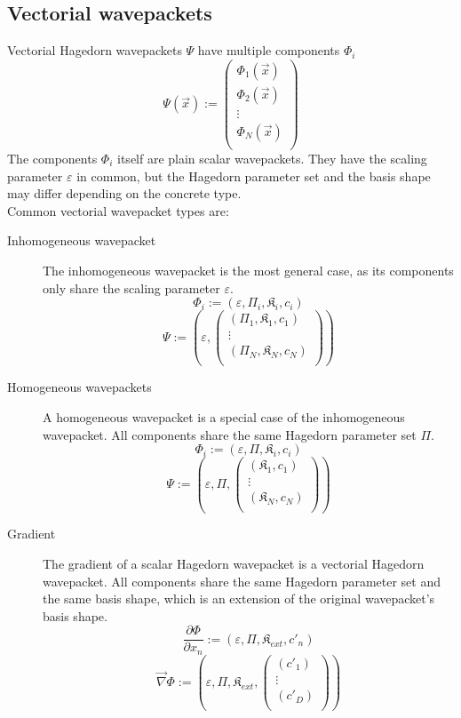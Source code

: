 \documentclass{article}
\begin{document}
\subsection{Vectorial wavepackets}
Vectorial Hagedorn wavepackets \(\Psi\) have multiple components \(\Phi_i\)
\[
  \Psi(\vec{x}) :=
  \begin{pmatrix}
    \Phi_1(\vec{x}) \\
    \Phi_2(\vec{x}) \\
    \vdots \\
    \Phi_N(\vec{x}) \\
  \end{pmatrix}
\]
The components \(\Phi_i\) itself are plain scalar wavepackets.
They have the scaling parameter \(\varepsilon\) in common, but
the Hagedorn parameter set and the basis shape may differ depending on
the concrete type. \\
Common vectorial wavepacket types are:
\begin{description}
\item[Inhomogeneous wavepacket]
  The inhomogeneous wavepacket is the most general case, as its components only share
  the scaling parameter \(\varepsilon\).
  \[
    \Phi_i := (\varepsilon, \Pi_i, \mathfrak{K}_i, c_i) \] \[
    \Psi := \left(\varepsilon, 
    \begin{pmatrix}
      (\Pi_1, \mathfrak{K}_1, c_1) \\
      \vdots \\
      (\Pi_N, \mathfrak{K}_N, c_N) \\
    \end{pmatrix}\right)
  \]
\item[Homogeneous wavepackets]
  A homogeneous wavepacket is a special case of the inhomogeneous wavepacket.
  All components share the same Hagedorn parameter set \(\Pi\).
  \[
    \Phi_i := (\varepsilon, \Pi, \mathfrak{K}_i, c_i) \] \[
    \Psi := \left(\varepsilon, \Pi,
    \begin{pmatrix}
      (\mathfrak{K}_1, c_1) \\
      \vdots \\
      (\mathfrak{K}_N, c_N) \\
    \end{pmatrix}\right)
  \]
\item[Gradient]
  The gradient of a scalar Hagedorn wavepacket is a vectorial Hagedorn
  wavepacket. All components share the same Hagedorn parameter set and the
  same basis shape, which is an extension of the original wavepacket's basis shape.
  \[
    \frac{\partial \Phi}{\partial x_n} := (\varepsilon, \Pi, \mathfrak{K}_{ext}, c'_n) \] \[
    \vec{\nabla} \Phi := \left(\varepsilon, \Pi, \mathfrak{K}_{ext},
    \begin{pmatrix}
      (c'_1) \\
      \vdots \\
      (c'_D) \\
    \end{pmatrix}\right)
  \]
\end{description}
\end{document}
